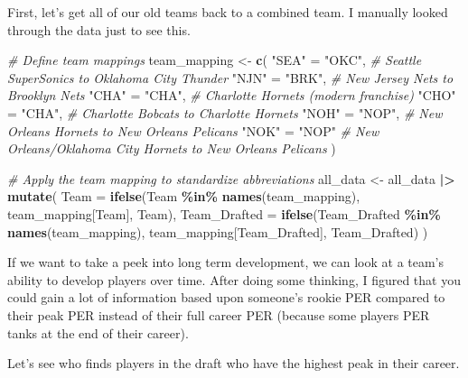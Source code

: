 \documentclass[
]{article}
\newenvironment{Shaded}{\begin{snugshade}}{\end{snugshade}}
\newcommand{\AttributeTok}[1]{\textcolor[rgb]{0.13,0.29,0.53}{#1}}
\newcommand{\CommentTok}[1]{\textcolor[rgb]{0.56,0.35,0.01}{\textit{#1}}}
\newcommand{\FunctionTok}[1]{\textcolor[rgb]{0.13,0.29,0.53}{\textbf{#1}}}
\newcommand{\NormalTok}[1]{#1}
\newcommand{\OtherTok}[1]{\textcolor[rgb]{0.56,0.35,0.01}{#1}}
\newcommand{\SpecialCharTok}[1]{\textcolor[rgb]{0.81,0.36,0.00}{\textbf{#1}}}
\newcommand{\StringTok}[1]{\textcolor[rgb]{0.31,0.60,0.02}{#1}}
\begin{document}
First, let's get all of our old teams back to a combined team. I
manually looked through the data just to see this.

\begin{Shaded}
\begin{Highlighting}[]
\CommentTok{\# Define team mappings}
\NormalTok{team\_mapping }\OtherTok{\textless{}{-}} \FunctionTok{c}\NormalTok{(}
  \StringTok{"SEA"} \OtherTok{=} \StringTok{"OKC"}\NormalTok{,  }\CommentTok{\# Seattle SuperSonics to Oklahoma City Thunder}
  \StringTok{"NJN"} \OtherTok{=} \StringTok{"BRK"}\NormalTok{,  }\CommentTok{\# New Jersey Nets to Brooklyn Nets}
  \StringTok{"CHA"} \OtherTok{=} \StringTok{"CHA"}\NormalTok{,  }\CommentTok{\# Charlotte Hornets (modern franchise)}
  \StringTok{"CHO"} \OtherTok{=} \StringTok{"CHA"}\NormalTok{,  }\CommentTok{\# Charlotte Bobcats to Charlotte Hornets}
  \StringTok{"NOH"} \OtherTok{=} \StringTok{"NOP"}\NormalTok{,  }\CommentTok{\# New Orleans Hornets to New Orleans Pelicans}
  \StringTok{"NOK"} \OtherTok{=} \StringTok{"NOP"}   \CommentTok{\# New Orleans/Oklahoma City Hornets to New Orleans Pelicans}
\NormalTok{)}

\CommentTok{\# Apply the team mapping to standardize abbreviations}
\NormalTok{all\_data }\OtherTok{\textless{}{-}}\NormalTok{ all\_data }\SpecialCharTok{|\textgreater{}}
  \FunctionTok{mutate}\NormalTok{(}
    \AttributeTok{Team =} \FunctionTok{ifelse}\NormalTok{(Team }\SpecialCharTok{\%in\%} \FunctionTok{names}\NormalTok{(team\_mapping), team\_mapping[Team], Team),}
    \AttributeTok{Team\_Drafted =} \FunctionTok{ifelse}\NormalTok{(Team\_Drafted }\SpecialCharTok{\%in\%} \FunctionTok{names}\NormalTok{(team\_mapping), team\_mapping[Team\_Drafted], Team\_Drafted)}
\NormalTok{  )}
\end{Highlighting}
\end{Shaded}

If we want to take a peek into long term development, we can look at a
team's ability to develop players over time. After doing some thinking,
I figured that you could gain a lot of information based upon someone's
rookie PER compared to their peak PER instead of their full career PER
(because some players PER tanks at the end of their career).

Let's see who finds players in the draft who have the highest peak in
their career.
\end{document}
